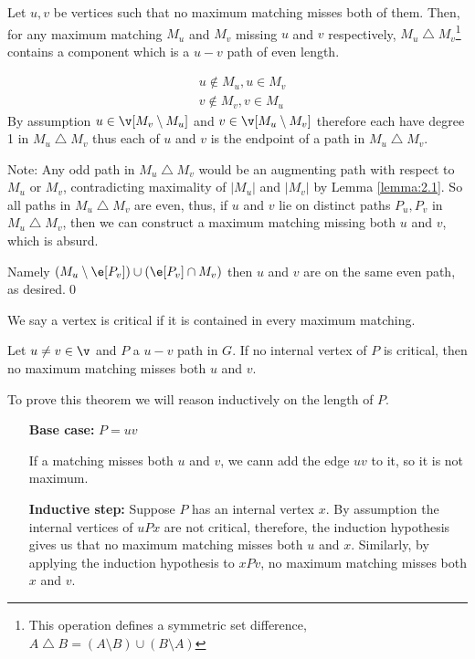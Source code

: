 \begin{prf}
    \begin{customclaim}{1}
    \label{claim:theorem_2.10_1}
        Let $u, v$ be vertices such that no maximum matching misses both of them. Then, for any maximum matching $M_u$ and $M_v$ missing $u$ and $v$ respectively, $M_u \bigtriangleup M_v$\footnote{This operation defines a symmetric set difference, $A \bigtriangleup B = (A \setminus B) \cup (B \setminus A)$} contains a component which is a $u - v$ path of even length.
    \end{customclaim}
    \begin{prf}
        \begin{align*}
            &u \notin M_u, u \in M_v\\
            &v \notin M_v, v \in M_u
        \end{align*}
        By assumption $u \in \v[M_v \setminus M_u]$ and $v \in \v[M_u \setminus M_v]$ therefore each have degree 1 in $M_u \bigtriangleup M_v$ thus each of $u$ and $v$ is the endpoint of a path in $M_u \bigtriangleup M_v$.

        Note: Any odd path in $M_u \bigtriangleup M_v$ would be an augmenting path with respect to $M_u$ or $M_v$, contradicting maximality of $|M_u|$ and $|M_v|$ by Lemma \ref{lemma:2.1}. So all paths in $M_u \bigtriangleup M_v$ are even, thus, if $u$ and $v$ lie on distinct paths $P_u, P_v$ in $M_u \bigtriangleup M_v$, then we can construct a maximum matching missing both $u$ and $v$, which is absurd.
        
        Namely $(M_u \setminus \e[P_v]) \cup (\e[P_v] \cap M_v)$ then $u$ and $v$ are on the same even path, as desired.\qed
    \end{prf}
    We say a vertex is critical if it is contained in every maximum matching.
    \begin{customclaim}{2}
    \label{claim:theorem_2.10_2}
        Let $u \neq v \in \v$ and $P$ a $u - v$ path in $G$. If no internal vertex of $P$ is critical, then no maximum matching misses both $u$ and $v$.
    \end{customclaim}
    \begin{prf}
        To prove this theorem we will reason inductively on the length of $P$.
        \begin{itemize}
            \item[\textbf{Base case:}] $P = uv$
            
            If a matching misses both $u$ and $v$, we cann add the edge $uv$ to it, so it is not maximum.
            \item[\textbf{Inductive step:}] Suppose $P$ has an internal vertex $x$. By assumption the internal vertices of $uPx$ are not critical, therefore, the induction hypothesis gives us that no maximum matching misses both $u$ and $x$. Similarly, by applying the induction hypothesis to $xPv$, no maximum matching misses both $x$ and $v$.
            

\end{itemize}
\end{prf}
\end{prf}
